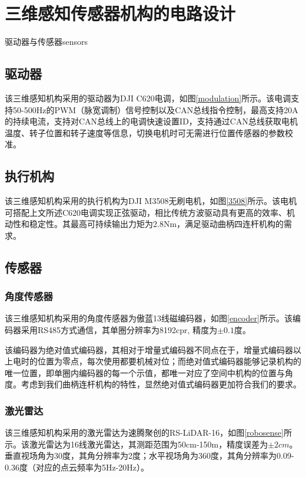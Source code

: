 \section{三维感知传感器机构的电路设计}

\begin{pics}[htbp]{驱动器与传感器}{sensors}
\end{pics}

\subsection{驱动器}
该三维感知机构采用的驱动器为DJI C620电调，如图\ref{modulation}所示。该电调支持50-500Hz的PWM（脉宽调制）信号控制以及CAN总线指令控制，最高支持20A的持续电流，支持对CAN总线上的电调快速设置ID，支持通过CAN总线获取电机温度、转子位置和转子速度等信息，切换电机时可无需进行位置传感器的参数校准。

\subsection{执行机构}
该三维感知机构采用的执行机构为DJI M3508无刷电机，如图\ref{3508}所示。该电机可搭配上文所述C620电调实现正弦驱动，相比传统方波驱动具有更高的效率、机动性和稳定性。其最高可持续输出力矩为2.8Nm，满足驱动曲柄四连杆机构的需求。
\subsection{传感器}

\subsubsection{角度传感器}
该三维感知机构采用的角度传感器为傲蓝13线磁编码器，如图\ref{encoder}所示。该编码器采用RS485方式通信，其单圈分辨率为8192cpr, 精度为$\pm 0.1$度。

该编码器为绝对值式编码器，其相对于增量式编码器不同点在于，增量式编码器以上电时的位置为零点，每次使用都要机械对位；而绝对值式编码器能够记录机构的唯一位置，即单圈内编码器的每一个示值，都唯一对应了空间中机构的位置与角度。考虑到我们曲柄连杆机构的特性，显然绝对值式编码器更加符合我们的要求。

\subsubsection{激光雷达}
该三维感知机构采用的激光雷达为速腾聚创的RS-LiDAR-16，如图\ref{robosense}所示。该激光雷达为16线激光雷达，其测距范围为50cm-150m，精度误差为$\pm 2cm$。垂直视场角为30度，其角分辨率为2度；水平视场角为360度，其角分辨率为0.09-0.36度（对应的点云频率为5Hz-20Hz）。

